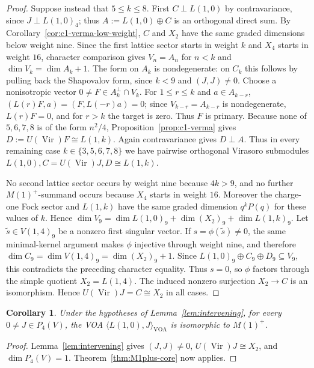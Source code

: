 \documentclass[10pt,a4paper]{amsart}
\numberwithin{equation}{section} \newtheorem{thm}{Theorem}[section] \newtheorem{lem}[thm]{Lemma} \newtheorem{ex}[thm]{Example} \newtheorem{prop}[thm]{Proposition} \newtheorem{cor}[thm]{Corollary} \newtheorem{defi}[thm]{Definition} \newtheorem{rmk}[thm]{Remark} \newtheorem{notation}[thm]{Notation}
\newcommand{\Vir}{\operatorname{Vir}}
\begin{document}
\begin{proof}
Suppose instead that $5\le k\le8$. First $C\perp L(1,0)$ by contravariance, since $J\perp L(1,0)_4$; thus $A:=L(1,0)\oplus C$ is an orthogonal direct sum. By Corollary~\ref{cor:c1-verma-low-weight}, $C$ and $X_2$ have the same graded dimensions below weight nine. Since the first lattice sector starts in weight $k$ and $X_4$ starts in weight $16$, character comparison gives $V_n=A_n$ for $n<k$ and $\dim V_k=\dim A_k+1$. The form on $A_k$ is nondegenerate: on $C_k$ this follows by pulling back the Shapovalov form, since $k<9$ and $(J,J)\ne0$. Choose a nonisotropic vector $0\ne F\in A_k^\perp\cap V_k$. For $1\le r\le k$ and $a\in A_{k-r}$, \((L(r)F,a)=(F,L(-r)a)=0\); since $V_{k-r}=A_{k-r}$ is nondegenerate, $L(r)F=0$, and for $r>k$ the target is zero. Thus $F$ is primary. Because none of $5,6,7,8$ is of the form $n^2/4$, Proposition~\ref{prop:c1-verma} gives \(D:=U(\Vir)F\cong L(1,k)\). Again contravariance gives $D\perp A$. Thus in every remaining case $k\in\{3,5,6,7,8\}$ we have pairwise orthogonal Virasoro submodules \(L(1,0), C=U(\Vir)J, D\cong L(1,k).\)

No second lattice sector occurs by weight nine because $4k>9$, and no further $M(1)^+$-summand occurs because $X_4$ starts in weight $16$. Moreover the charge-one Fock sector and $L(1,k)$ have the same graded dimension $q^kP(q)$ for these values of $k$. Hence \(\dim V_9=\dim L(1,0)_9+\dim(X_2)_9+\dim L(1,k)_9.\) Let $\widetilde s\in V(1,4)_9$ be a nonzero first singular vector. If $s=\phi(\widetilde s)\ne0$, the same minimal-kernel argument makes $\phi$ injective through weight nine, and therefore \(\dim C_9=\dim V(1,4)_9=\dim(X_2)_9+1\). Since $L(1,0)_9\oplus C_9\oplus D_9\subseteq V_9$, this contradicts the preceding character equality. Thus $s=0$, so $\phi$ factors through the simple quotient $X_2=L(1,4)$. The induced nonzero surjection $X_2\to C$ is an isomorphism. Hence \(U(\Vir)J=C\cong X_2\) in all cases.
\end{proof}

\begin{cor}\label{cor:M1plus-kgt4}
Under the hypotheses of Lemma~\ref{lem:intervening}, for every \(0\ne J\in P_4(V)\), the VOA \(\langle L(1,0),J\rangle_{\mathrm{VOA}}\) is isomorphic to \(M(1)^+\).
\end{cor}

\begin{proof}
Lemma~\ref{lem:intervening} gives \((J,J)\ne0\), \(U(\Vir)J\cong X_2\), and \(\dim P_4(V)=1\). Theorem~\ref{thm:M1plus-core} now applies.
\end{proof}
\end{document}
